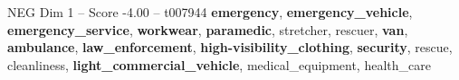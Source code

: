 \begin{textsample}{NEG Dim 1 – Score -4.00 – t007944}  \label{ex:f1_neg_013}
\textbf{emergency}, \textbf{emergency\_vehicle}, \textbf{emergency\_service}, \textbf{workwear}, \textbf{paramedic}, stretcher, rescuer, \textbf{van}, \textbf{ambulance}, \textbf{law\_enforcement}, \textbf{high-visibility\_clothing}, \textbf{security}, rescue, cleanliness, \textbf{light\_commercial\_vehicle}, medical\_equipment, health\_care

\end{textsample}
